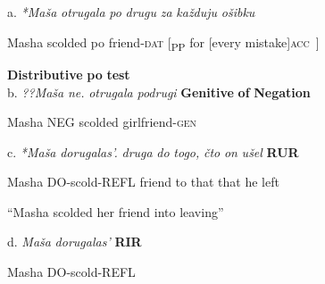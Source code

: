 \documentclass[output=paper,modfonts, nonflat]{langsci/langscibook}
\begin{document}
\begin{styleinnerExample}
\begin{styleinnerExample}
\ea%
    \label{ex:key:55}
    \gll\\
        \\
    \glt
    \z

          a.  \textit{*Maša}  \textit{otrugala} \textit{po} \textit{drugu} \textit{za} \textit{každuju}             \textit{ošibku} 
\end{styleinnerExample}

\begin{styleinnerExample}
    Masha scolded  po friend-\textsc{dat} [\textsubscript{PP} for [every mistake]\textsc{acc~}]
\end{styleinnerExample}

\begin{styleinnerExample}
                \textbf{Distributive} \textbf{po} \textbf{test}\\
b.  \textit{??Maša}    \textit{ne.}    \textit{otrugala} \textit{podrugi}      \textbf{Genitive} \textbf{of} \textbf{Negation}
\end{styleinnerExample}

\begin{styleinnerExample}
        Masha NEG scolded   girlfriend-\textsc{gen\\
}
\end{styleinnerExample}

\begin{styleinnerExample}
  c.  \textit{*Maša}    \textit{dorugalas’.}         \textit{druga} \textit{do} \textit{togo,} \textit{čto}  \textit{on} \textit{ušel}                    \textbf{RUR}
\end{styleinnerExample}

\begin{styleinnerExample}
      Masha  DO-scold-REFL friend to  that  that  he left
\end{styleinnerExample}

\begin{styleinnerExample}
    “Masha scolded her friend into leaving”
\end{styleinnerExample}

\begin{styleinnerExample}
  d.  \textit{Maša}    \textit{dorugalas’}                       \textbf{RIR} \citep{Tatevosov2010}
\end{styleinnerExample}

\begin{styleinnerExample}
    Masha  DO-scold-REFL
\end{styleinnerExample}


\end{styleinnerExample}
\end{document}
